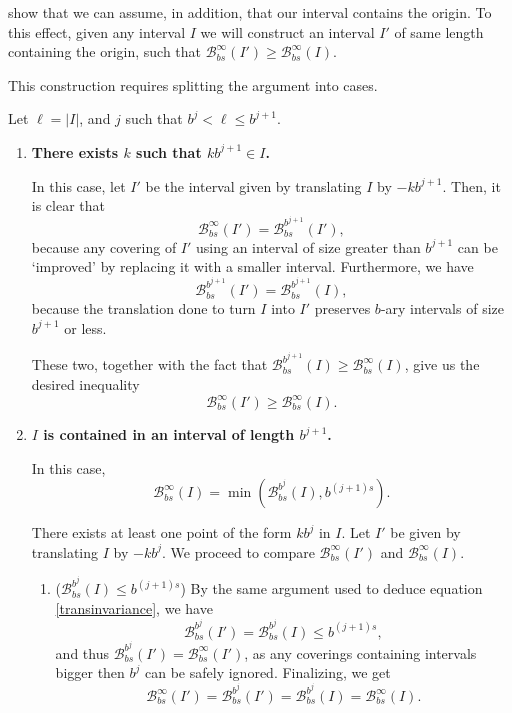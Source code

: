 \documentclass[11pt, reqno]{amsart}
\newcommand{\BB}{\mathcal{B}}
\begin{document}
show that we can assume, in addition, that our interval contains the origin. To this effect, given any interval $I$ we will construct an interval $I'$ of same length containing the origin, such that $\BB_{bs}^\infty(I') \geq \BB_{bs}^\infty(I)$.

This construction requires splitting the argument into cases.

Let $\ell = \lvert I \rvert$, and $j$ such that $b^j < \ell \leq b^{j+1}$.

\begin{enumerate}[label=\textbf{Case \arabic*:}]

\item \textbf{There exists $k$ such that $k b^{j+1} \in I$.}

In this case, let $I'$ be the interval given by translating $I$ by $-k b^{j+1}$. Then, it is clear that
\[\BB_{bs}^\infty(I') = \BB_{bs}^{b^{j+1}}(I'),\]
because any covering of $I'$ using an interval of size greater than $b^{j+1}$ can be `improved' by replacing it with a smaller interval. Furthermore, we have
\begin{equation}\label{transinvariance}
\BB_{bs}^{b^{j+1}}(I') = \BB_{bs}^{b^{j+1}}(I),
\end{equation}
because the translation done to turn $I$ into $I'$ preserves $b$-ary intervals of size $b^{j+1}$ or less.

These two, together with the fact that $\BB_{bs}^{b^{j+1}}(I) \geq \BB_{bs}^\infty(I)$, give us the desired inequality
\[\BB_{bs}^\infty(I') \geq \BB_{bs}^\infty(I).\]

\item \textbf{$I$ is contained in an interval of length $b^{j+1}$.}

In this case, 
\[\BB_{bs}^\infty(I) = \min(\BB_{bs}^{b^j}(I), b^{(j+1)s}).\]

There exists at least one point of the form $k b^j$ in $I$. Let $I'$ be given by translating $I$ by $-k b^j$. We proceed to compare $\BB_{bs}^\infty(I')$ and $\BB_{bs}^\infty(I)$.

\begin{enumerate}[label=\textbf{Subcase \roman*)}]

\item ($\BB_{bs}^{b^j}(I) \leq b^{(j+1)s}$) By the same argument used to deduce equation \eqref{transinvariance}, we have
\[\BB_{bs}^{b^j}(I') = \BB_{bs}^{b^j}(I) \leq b^{(j+1)s},\]
and thus $\BB_{bs}^{b^j}(I') = \BB_{bs}^\infty(I')$, as any coverings containing intervals bigger then $b^j$ can be safely ignored. Finalizing, we get
\[\BB_{bs}^\infty(I') = \BB_{bs}^{b^j}(I') = \BB_{bs}^{b^j}(I) = \BB_{bs}^\infty(I).\]


\end{enumerate}
\end{enumerate}
\end{document}
